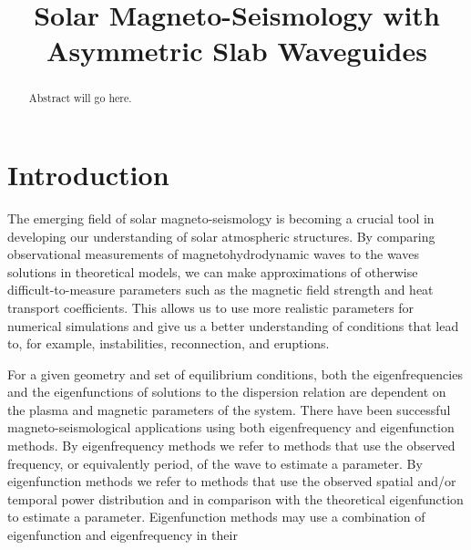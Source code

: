 \documentclass[namedreferences]{solarphysics}
\numberwithin{equation}{section}
\begin{document}
\begin{article}

\begin{opening}

\title{Solar Magneto-Seismology with Asymmetric Slab Waveguides}

\author[addressref={UoS},email={}]{}

\author[addressref={UoS},corref,email={robertus@sheffield.ac.uk}]{}

%

\address[id={UoS}]{Solar Physics and Space Plasma Research Centre, School of Mathematics and Statistics, University of Sheffield, Hicks Building, Hounsfield Road, Sheffield, S3 7RH, UK.}


\begin{abstract}
Abstract will go here.
\end{abstract}
\end{opening}

\section{Introduction}
The emerging field of solar magneto-seismology is becoming a crucial tool in developing our understanding of solar atmospheric structures. By comparing observational measurements of magnetohydrodynamic waves to the waves solutions in theoretical models, we can make approximations of otherwise difficult-to-measure parameters such as the magnetic field strength and heat transport coefficients. This allows us to use more realistic parameters for numerical simulations and give us a better understanding of conditions that lead to, for example, instabilities, reconnection, and eruptions.

For a given geometry and set of equilibrium conditions, both the eigenfrequencies and the eigenfunctions of solutions to the dispersion relation are dependent on the plasma and magnetic parameters of the system. There have been successful magneto-seismological applications using both eigenfrequency and eigenfunction methods. By eigenfrequency methods we refer to methods that use the observed frequency, or equivalently period, of the wave to estimate a parameter. By eigenfunction methods we refer to methods that use the observed spatial and/or temporal power distribution and in comparison with the theoretical eigenfunction to estimate a parameter. Eigenfunction methods may use a combination of eigenfunction and eigenfrequency in their 


\end{article}
\end{document}
